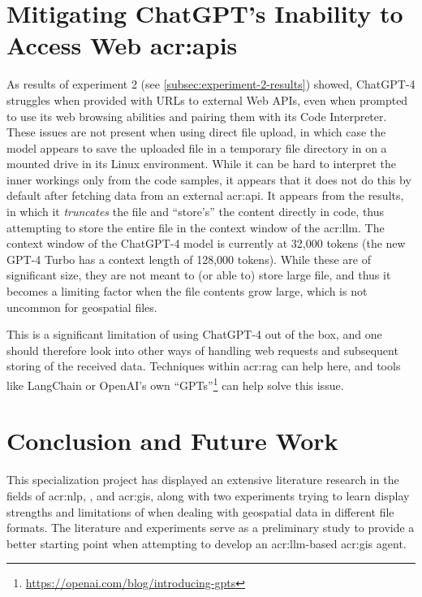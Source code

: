 \section[Mitigating ChatGPT's Inability to Access Web APIs]{Mitigating ChatGPT's Inability to Access Web \acrshort{acr:api}s}\label{sec:api-access-discussion}

As results of experiment 2 (see \autoref{subsec:experiment-2-results}) showed, ChatGPT-4 struggles when provided with URLs to external Web APIs, even when prompted to use its web browsing abilities and pairing them with its Code Interpreter. These issues are not present when using direct file upload, in which case the model appears to save the uploaded file in a temporary file directory in on a mounted drive in its Linux environment. While it can be hard to interpret the inner workings only from the code samples, it appears that it does not do this by default after fetching data from an external \acrshort{acr:api}. It appears from the results, in which it \textit{truncates} the file and \enquote{store's} the content directly in code, thus attempting to store the entire file in the context window of the  \acrshort{acr:llm}. The context window of the ChatGPT-4 model is currently at 32,000 tokens (the new GPT-4 Turbo has a context length of 128,000 tokens). While these are of significant size, they are not meant to (or able to) store large file, and thus it becomes a limiting factor when the file contents grow large, which is not uncommon for geospatial files.

This is a significant limitation of using ChatGPT-4 out of the box, and one should therefore look into other ways of handling web requests and subsequent storing of the received data. Techniques within \gls{acr:rag} can help here, and tools like LangChain or OpenAI's own \enquote{GPTs}\footnote{\url{https://openai.com/blog/introducing-gpts}} can help solve this issue.



\section{Conclusion and Future Work}\label{sec:conclusion-and-future-work}

This specialization project has displayed an extensive literature research in the fields of \acrlong{acr:nlp}, , and \acrlong{acr:gis}, along with two experiments trying to learn display strengths and limitations of  when dealing with geospatial data in different file formats. The literature and experiments serve as a preliminary study to provide a better starting point when attempting to develop an \acrshort{acr:llm}-based \acrshort{acr:gis} agent.

